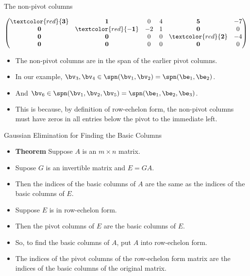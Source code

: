 \documentclass{beamer}
\begin{document}
\begin{frame}{The non-pivot columns}

$
\begin{pmatrix}
\textcolor{red}{\mathbf{3}} & \mathbf{1}                   &  0  & 4 & \mathbf{5}                  & -7 \\
\mathbf{0}                  & \textcolor{red}{\mathbf{-1}} & -2  & 1 & \mathbf{0}                  & 0  \\
\mathbf{0}                  & \mathbf{0}                   &  0  & 0 & \textcolor{red}{\mathbf{2}} & -4 \\
\mathbf{0}                  & \mathbf{0}                   &  0  & 0 & \mathbf{0}                  & 0  \\
\end{pmatrix}
$
\begin{itemize}
\item The non-pivot columns are in the span of the earlier pivot columns.
\item In our example, $\bv_3,\bv_4\in\spn(\bv_1,\bv_2) = \spn(\be_1,\be_2)$.
\item And $\bv_6\in\spn(\bv_1,\bv_2,\bv_5) = \spn(\be_1,\be_2,\be_3)$.
\item This is because, by definition of row-echelon form, the non-pivot columns must have zeros
in all entries below the pivot to the immediate left.
\end{itemize}

\end{frame}

\begin{frame}{Gaussian Elimination for Finding the Basic Columns}

\begin{itemize}
\item \textbf{Theorem} Suppose $A$ is an $m\times n$ matrix.
\item Supose $G$ is an invertible matrix and $E=GA$.
\item Then the indices of the basic columns of $A$ are the same as the
indices of the basic columns of $E$.
\item Suppose $E$ is in row-echelon form.
\item Then the pivot columns of $E$ are the basic columns of $E$.
\item So, to find the basic columns of $A$, put $A$ into row-echelon form.
\item The indices of the pivot columns of the row-echelon form matrix
are the indices of the basic columns of the original matrix.
\end{itemize}

\end{frame}
\end{document}
